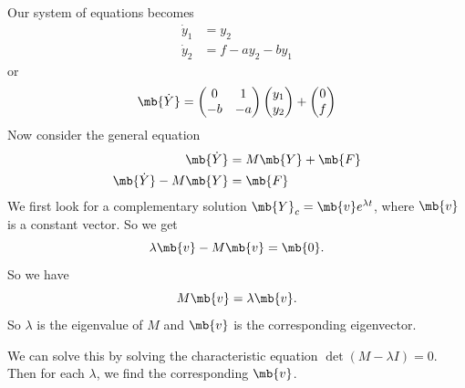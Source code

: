 \documentclass[a4paper]{article}
\begin{document}
Our system of equations becomes
\begin{align*}
  \dot y_1 &= y_2\\
  \dot y_2 &= f - a y_2 - by_1
\end{align*}
or
\[
\mb{\dot{Y}} = 
\begin{pmatrix}
  0 & 1\\
  -b & -a
\end{pmatrix}
\begin{pmatrix}
  y_1\\y_2
\end{pmatrix} + 
\begin{pmatrix}
  0 \\ f
\end{pmatrix}
\]
Now consider the general equation
\begin{align*}
  \mb{\dot {Y}} &= M\mb{Y} + \mb{F}\\
  \mb{\dot {Y}} - M\mb{Y} &= \mb{F}
\end{align*}
We first look for a complementary solution $\mb{Y}_c = \mb{v} e^{\lambda t}$, where $\mb{v}$ is a constant vector. So we get
\[
\lambda\mb{v} - M\mb{v} = \mb{0}.
\]
So we have
\[
M\mb{v} = \lambda \mb{v}.
\]
So $\lambda$ is the eigenvalue of $M$ and $\mb{v}$ is the corresponding eigenvector.

We can solve this by solving the characteristic equation $\det(M - \lambda I) = 0$. Then for each $\lambda$, we find the corresponding $\mb{v}$.
\end{document}
